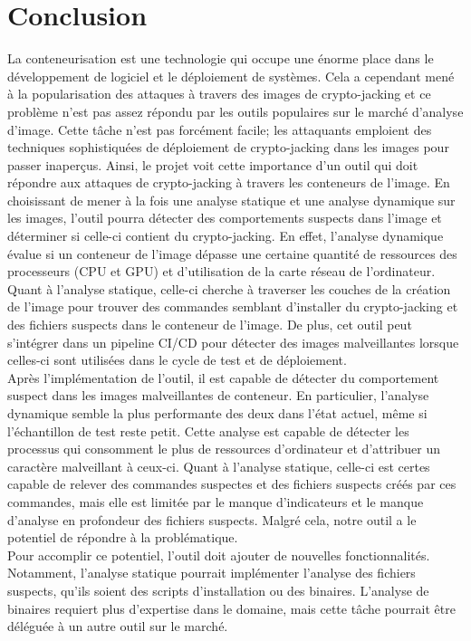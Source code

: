 \section{Conclusion}
La conteneurisation est une technologie qui occupe une énorme place dans le développement de logiciel et le déploiement de systèmes. Cela a cependant mené à la popularisation des attaques à travers des images de crypto-jacking et ce problème n'est pas assez répondu par les outils populaires sur le marché d'analyse d'image.  Cette tâche n'est pas forcément facile; les attaquants emploient des techniques sophistiquées de déploiement de crypto-jacking dans les images pour passer inaperçus. Ainsi, le projet voit cette importance d'un outil qui doit répondre aux attaques de crypto-jacking à travers les conteneurs de l'image. En choisissant de mener à la fois une analyse statique et une analyse dynamique sur les images, l'outil pourra détecter des comportements suspects dans l'image et déterminer si celle-ci contient du crypto-jacking. En effet, l'analyse dynamique évalue si un conteneur de l'image dépasse une certaine quantité de ressources des processeurs (CPU et GPU) et d'utilisation de la carte réseau de l'ordinateur. Quant à l'analyse statique, celle-ci cherche à traverser les couches de la création de l'image pour trouver des commandes semblant d'installer du crypto-jacking et des fichiers suspects dans le conteneur de l'image. De plus, cet outil peut s'intégrer dans un pipeline CI/CD pour détecter des images malveillantes lorsque celles-ci sont utilisées dans le cycle de test et de déploiement. \\

Après l'implémentation de l'outil, il est capable de détecter du comportement suspect dans les images malveillantes de conteneur. En particulier, l'analyse dynamique semble la plus performante des deux dans l'état actuel, même si l'échantillon de test reste petit. Cette analyse est capable de détecter les processus qui consomment le plus de ressources d'ordinateur et d'attribuer un caractère malveillant à ceux-ci. Quant à l'analyse statique, celle-ci est certes capable de relever des commandes suspectes et des fichiers suspects créés par ces commandes, mais elle est limitée par le manque d'indicateurs et le manque d'analyse en profondeur des fichiers suspects. Malgré cela, notre outil a le potentiel de répondre à la problématique. \\

Pour accomplir ce potentiel, l'outil doit ajouter de nouvelles fonctionnalités. Notamment, l'analyse statique pourrait implémenter l'analyse des fichiers suspects, qu'ils soient des scripts d'installation ou des binaires. L'analyse de binaires requiert plus d'expertise dans le domaine, mais cette tâche pourrait être déléguée à un autre outil sur le marché. \\


